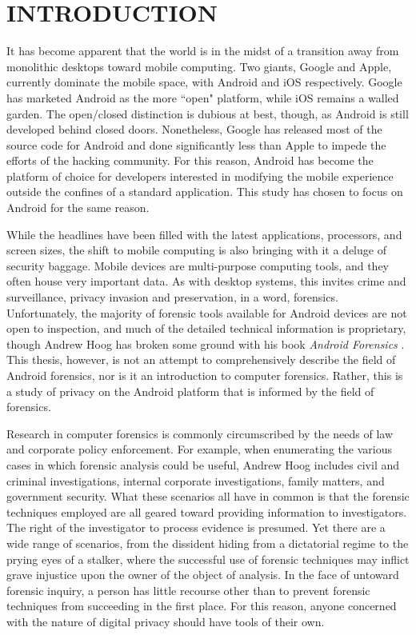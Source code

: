 \chapter{INTRODUCTION}
\label{ch:introduction}

It has become apparent that the world is in the midst of a transition away from monolithic desktops toward mobile computing.  Two
giants, Google and Apple, currently dominate the mobile space, with Android and iOS respectively.  Google has marketed Android as
the more ``open" platform, while iOS remains a walled garden.  The open/closed distinction is dubious at best, though, as Android is
still developed behind closed doors.  Nonetheless, Google has released most of the source code for Android and done significantly
less than Apple to impede the efforts of the hacking community. For this reason, Android has become the platform of choice for
developers interested in modifying the mobile experience outside the confines of a standard application.  This study has chosen
to focus on Android for the same reason.

While the headlines have been filled with the latest applications, processors, and screen sizes, the shift to mobile computing is
also bringing with it a deluge of security baggage. Mobile devices are multi-purpose computing tools, and they often house very
important data. As with desktop systems, this invites crime and surveillance, privacy invasion and preservation, in a word,
forensics.  Unfortunately, the majority of forensic tools available for Android devices are not open to inspection, and much of the
detailed technical information is proprietary, though Andrew Hoog has broken some ground with his book \emph{Android Forensics}
\citeyear{hoog}.  This thesis, however, is not an attempt to comprehensively describe the field of Android forensics, nor is it an
introduction to computer forensics. Rather, this is a study of privacy on the Android platform that is informed by the field of
forensics.

Research in computer forensics is commonly circumscribed by the needs of law and corporate policy enforcement.  For example, when
enumerating the various cases in which forensic analysis could be useful, Andrew Hoog includes civil and criminal investigations,
internal corporate investigations, family matters, and government security.  What these scenarios all have in common is
that the forensic techniques employed are all geared toward providing information to investigators.  The right of the investigator
to process evidence is presumed.  Yet there are a wide range of scenarios, from the dissident hiding from a dictatorial regime to
the prying eyes of a stalker, where the successful use of forensic techniques may inflict grave injustice upon the owner of the
object of analysis.  In the face of untoward forensic inquiry, a person has little recourse other than to prevent forensic
techniques from succeeding in the first place. For this reason, anyone concerned with the nature of digital privacy should have
tools of their own.  


